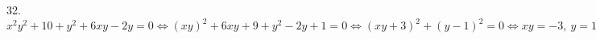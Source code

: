 32. $x^2y^2+10+y^2+6xy-2y=0\Leftrightarrow (xy)^2+6xy+9+y^2-2y+1=0\Leftrightarrow
(xy+3)^2+(y-1)^2=0\Leftrightarrow xy=-3,\ y=1\Leftrightarrow x=-3,\ y=1.$\\
